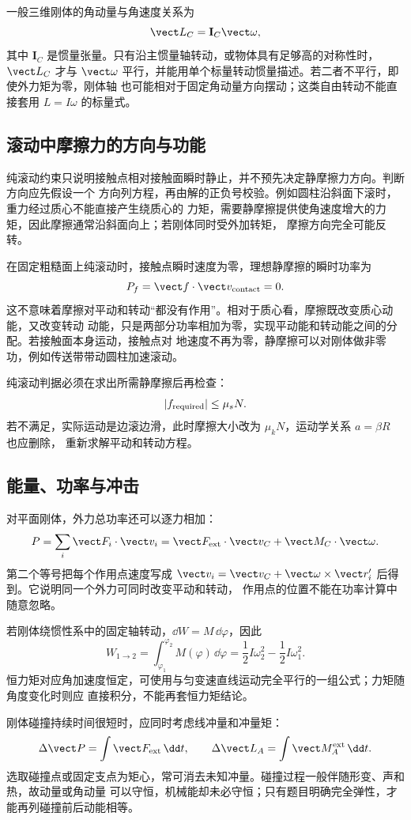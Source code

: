 一般三维刚体的角动量与角速度关系为
\begin{equation}
 \vect L_C=\mathbf I_C\vect\omega,
\end{equation}
其中 $\mathbf I_C$ 是惯量张量。只有沿主惯量轴转动，或物体具有足够高的对称性时，$\vect L_C$
才与 $\vect\omega$ 平行，并能用单个标量转动惯量描述。若二者不平行，即使外力矩为零，刚体轴
也可能相对于固定角动量方向摆动；这类自由转动不能直接套用 $L=I\omega$ 的标量式。

\subsection*{滚动中摩擦力的方向与功能}

纯滚动约束只说明接触点相对接触面瞬时静止，并不预先决定静摩擦力方向。判断方向应先假设一个
方向列方程，再由解的正负号校验。例如圆柱沿斜面下滚时，重力经过质心不能直接产生绕质心的
力矩，需要静摩擦提供使角速度增大的力矩，因此摩擦通常沿斜面向上；若刚体同时受外加转矩，
摩擦方向完全可能反转。

在固定粗糙面上纯滚动时，接触点瞬时速度为零，理想静摩擦的瞬时功率为
\begin{equation}
 P_f=\vect f\cdot\vect v_{\rm contact}=0.
\end{equation}
这不意味着摩擦对平动和转动“都没有作用”。相对于质心看，摩擦既改变质心动能，又改变转动
动能，只是两部分功率相加为零，实现平动能和转动能之间的分配。若接触面本身运动，接触点对
地速度不再为零，静摩擦可以对刚体做非零功，例如传送带带动圆柱加速滚动。

纯滚动判据必须在求出所需静摩擦后再检查：
\begin{equation}
 |f_{\rm required}|\leq \mu_sN.
\end{equation}
若不满足，实际运动是边滚边滑，此时摩擦大小改为 $\mu_kN$，运动学关系 $a=\beta R$ 也应删除，
重新求解平动和转动方程。

\subsection*{能量、功率与冲击}

对平面刚体，外力总功率还可以逐力相加：
\begin{equation}
 P=\sum_i\vect F_i\cdot\vect v_i
 =\vect F_{\rm ext}\cdot\vect v_C+\vect M_C\cdot\vect\omega.
\end{equation}
第二个等号把每个作用点速度写成
$\vect v_i=\vect v_C+\vect\omega\times\vect r_i'$ 后得到。它说明同一个外力可同时改变平动和转动，
作用点的位置不能在功率计算中随意忽略。

若刚体绕惯性系中的固定轴转动，$\dd W=M\,\dd\varphi$，因此
\begin{equation}
 W_{1\to2}=\int_{\varphi_1}^{\varphi_2}M(\varphi)\,\dd\varphi
 =\frac12I\omega_2^2-\frac12I\omega_1^2.
\end{equation}
恒力矩对应角加速度恒定，可使用与匀变速直线运动完全平行的一组公式；力矩随角度变化时则应
直接积分，不能再套恒力矩结论。

刚体碰撞持续时间很短时，应同时考虑线冲量和冲量矩：
\begin{equation}
 \Delta\vect P=\int\vect F_{\rm ext}\,\dd t,
 \qquad
 \Delta\vect L_A=\int\vect M_A^{\rm ext}\,\dd t.
\end{equation}
选取碰撞点或固定支点为矩心，常可消去未知冲量。碰撞过程一般伴随形变、声和热，故动量或角动量
可以守恒，机械能却未必守恒；只有题目明确完全弹性，才能再列碰撞前后动能相等。
